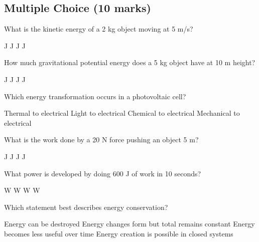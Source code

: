 \documentclass[addpoints]{exam}
\begin{document}
\newpage

\begin{questions}

\section*{Multiple Choice (10 marks)}
\vspace{5mm}

\question[1] What is the kinetic energy of a 2 kg object moving at 5 m/s?
\begin{choices}
     J
     J
     J
     J
\end{choices}
\vspace{8mm}

\question[1] How much gravitational potential energy does a 5 kg object have at 10 m height?
\begin{choices}
     J
     J
     J
     J
\end{choices}
\vspace{8mm}

\question[1] Which energy transformation occurs in a photovoltaic cell?
\begin{choices}
    \choice Thermal to electrical
    \correctchoice Light to electrical
    \choice Chemical to electrical
    \choice Mechanical to electrical
\end{choices}
\vspace{8mm}

\question[1] What is the work done by a 20 N force pushing an object 5 m?
\begin{choices}
     J
     J
     J
     J
\end{choices}
\vspace{8mm}

\question[1] What power is developed by doing 600 J of work in 10 seconds?
\begin{choices}
     W
     W
     W
     W
\end{choices}
\vspace{8mm}

\question[1] Which statement best describes energy conservation?
\begin{choices}
    \choice Energy can be destroyed
    \correctchoice Energy changes form but total remains constant
    \choice Energy becomes less useful over time
    \choice Energy creation is possible in closed systems
\end{choices}
\vspace{8mm}


\end{questions}
\end{document}
